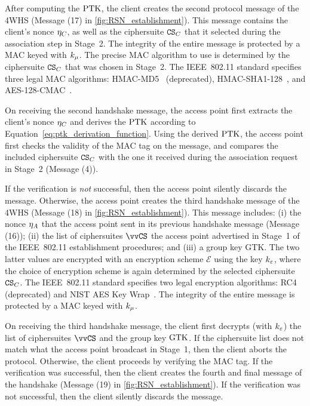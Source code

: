 After computing the $\mathrm{PTK}$,
the client creates the second protocol message of the 4WHS (Message (17) in \cref{fig:RSN_establishment}).
This message contains the client's nonce $\eta_C$,
as well as the ciphersuite $\mathtt{CS}_C$ that it selected during the association step in Stage~2.
The integrity of the entire message is protected by a MAC keyed with $k_\mu$.
The precise MAC algorithm to use is determined by the ciphersuite $\mathtt{CS}_C$ that was chosen in Stage~2.
The IEEE~802.11 standard specifies three legal MAC algorithms:
HMAC-MD5~\cite{IETF:RFC2104:HMAC} (deprecated), 
HMAC-SHA1-128~\cite{IETF:RFC2104:HMAC},
and AES-128-CMAC~\cite{FIPS:SP-800-38B:CMAC}. 

On receiving the second handshake message,
the access point first extracts the client's nonce $\eta_C$ and derives the $\mathrm{PTK}$ according to Equation~\eqref{eq:ptk_derivation_function}.  
Using the derived $\mathrm{PTK}$, the access point first checks the validity of the MAC tag on the message,
and compares the included ciphersuite $\mathtt{CS}_C$ with the one it received during the association request in Stage~2 (Message (4)).

If the verification is \emph{not} successful,
then the access point silently discards the message.
Otherwise,
the access point creates the third handshake message of the 4WHS (Message (18) in \cref{fig:RSN_establishment}).
This message includes: (i) the nonce $\eta_{A}$ that the access point sent in its previous handshake message (Message (16));
(ii) the list of ciphersuites $\CSlist$ the access point advertised in Stage~1 of the IEEE~802.11 establishment procedures;
and (iii) a group key GTK.
The two latter values are encrypted with an encryption scheme $\mathcal{E}$ using the key $k_\varepsilon$,
where the choice of encryption scheme is again determined by the selected ciphersuite $\mathtt{CS}_C$.
The IEEE~802.11 standard specifies two legal encryption algorithms:
RC4 (deprecated) and NIST AES Key Wrap~\cite{IETF:RFC3394:AES-key-wrap}. 
The integrity of the entire message is protected by a MAC keyed with $k_\mu$.

On receiving the third handshake message,
the client first decrypts (with $k_\varepsilon$)
the list of ciphersuites $\CSlist$ and the group key $\mathrm{GTK}$.
If the ciphersuite list does not match what the access point broadcast in Stage~1,
then the client aborts the protocol.
Otherwise,
the client proceeds by verifying the MAC tag.
If the verification was successful,
then the client creates the fourth and final message of the handshake (Message (19) in \cref{fig:RSN_establishment}).
If the verification was not successful,
then the client silently discards the message.




